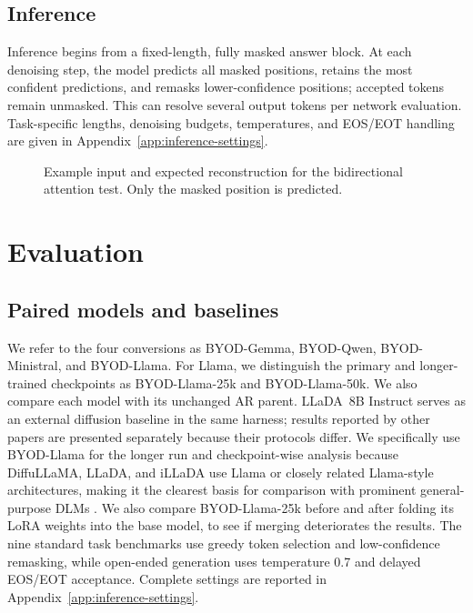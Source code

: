 \documentclass{article}
\begin{document}
\subsection{Inference}
Inference begins from a fixed-length, fully masked answer block. At each denoising step, the model predicts all masked positions, retains the most confident predictions, and remasks lower-confidence positions; accepted tokens remain unmasked. This can resolve several output tokens per network evaluation. Task-specific lengths, denoising budgets, temperatures, and EOS/EOT handling are given in Appendix~\ref{app:inference-settings}.

\begin{figure}[t]
\centering
{}
\caption{Example input and expected reconstruction for the bidirectional attention test. Only the masked position is predicted.}
\label{fig:bidirectional-example}
\end{figure}

\section{Evaluation}
\subsection{Paired models and baselines}
We refer to the four conversions as BYOD-Gemma, BYOD-Qwen, BYOD-Ministral, and BYOD-Llama. For Llama, we distinguish the primary and longer-trained checkpoints as BYOD-Llama-25k and BYOD-Llama-50k. We also compare each model with its unchanged AR parent. LLaDA~8B Instruct serves as an external diffusion baseline in the same harness; results reported by other papers are presented separately because their protocols differ. We specifically use BYOD-Llama for the longer run and checkpoint-wise analysis because DiffuLLaMA, LLaDA, and iLLaDA use Llama or closely related Llama-style architectures, making it the clearest basis for comparison with prominent general-purpose DLMs \citep{gong2025diffullama,nie2025llada,nie2026illada}. We also compare BYOD-Llama-25k before and after folding its LoRA weights into the base model, to see if merging deteriorates the results. The nine standard task benchmarks use greedy token selection and low-confidence remasking, while open-ended generation uses temperature 0.7 and delayed EOS/EOT acceptance. Complete settings are reported in Appendix~\ref{app:inference-settings}.
\end{document}
